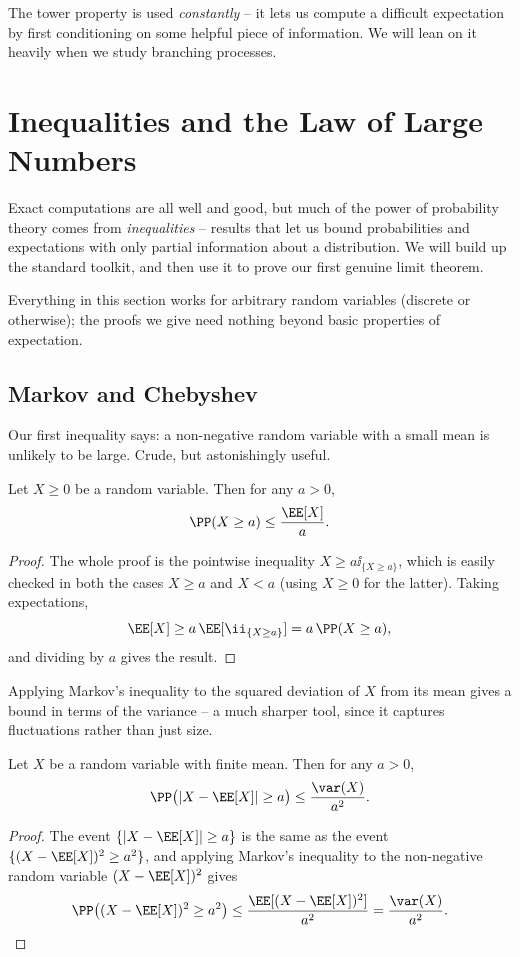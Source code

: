The tower property is used \emph{constantly} -- it lets us compute a difficult expectation by first conditioning on some helpful piece of information. We will lean on it heavily when we study branching processes.


\section{Inequalities and the Law of Large Numbers}

Exact computations are all well and good, but much of the power of probability theory comes from \emph{inequalities} -- results that let us bound probabilities and expectations with only partial information about a distribution. We will build up the standard toolkit, and then use it to prove our first genuine limit theorem.

Everything in this section works for arbitrary random variables (discrete or otherwise); the proofs we give need nothing beyond basic properties of expectation.

\subsection{Markov and Chebyshev}

Our first inequality says: a non-negative random variable with a small mean is unlikely to be large. Crude, but astonishingly useful.

\begin{theorem}
	Let $X \geq 0$ be a random variable. Then for any $a > 0$,
	$$
	\PP(X \geq a) \leq \frac{\EE[X]}{a}.
	$$
\end{theorem}
\begin{proof}
	The whole proof is the pointwise inequality $X \geq a \ii_{\{X \geq a\}}$, which is easily checked in both the cases $X \geq a$ and $X < a$ (using $X \geq 0$ for the latter). Taking expectations,
	$$
	\EE[X] \geq a \, \EE[\ii_{\{X \geq a\}}] = a\,\PP(X \geq a),
	$$
	and dividing by $a$ gives the result.
\end{proof}

Applying Markov's inequality to the squared deviation of $X$ from its mean gives a bound in terms of the variance -- a much sharper tool, since it captures fluctuations rather than just size.

\begin{theorem}
	Let $X$ be a random variable with finite mean. Then for any $a > 0$,
	$$
	\PP\big(|X - \EE[X]| \geq a\big) \leq \frac{\var(X)}{a^2}.
	$$
\end{theorem}
\begin{proof}
	The event $\{|X - \EE[X]| \geq a\}$ is the same as the event $\{(X - \EE[X])^2 \geq a^2\}$, and applying Markov's inequality to the non-negative random variable $(X - \EE[X])^2$ gives
	$$
	\PP\big((X - \EE[X])^2 \geq a^2\big) \leq \frac{\EE[(X - \EE[X])^2]}{a^2} = \frac{\var(X)}{a^2}. \qedhere
	$$
\end{proof}

